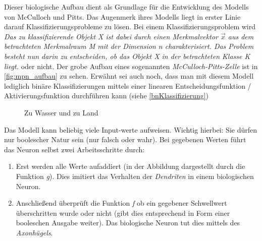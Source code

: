 Dieser biologische Aufbau dient als Grundlage für die Entwicklung des Modells von McCulloch und Pitts. Das Augenmerk ihres Modells liegt in erster Linie darauf Klassifizierungsprobleme zu lösen. Bei einem Klassifizierungsproblem wird \emph{Das zu klassifizierende Objekt X ist dabei durch einen Merkmalvektor $\vec{x}$ aus dem betrachteten Merkmalraum M mit der Dimension n charakterisiert. Das Problem besteht nun darin zu entscheiden, ob das Objekt X in der betrachteten Klasse K liegt.} \cite{klproblem} oder nicht. Der grobe Aufbau eines sogenannten \emph{McCulloch-Pitts-Zelle} ist in \ref{fig:mpn_aufbau} zu sehen. Erwähnt sei auch noch, dass man mit diesem Modell lediglich binäre Klassifizierungen mittels einer linearen Entscheidungsfunktion / Aktivierungsfunktion durchführen kann (siehe \ref{bnKlassifizierung})


\begin{figure}%
  \centering
  \qquad
  \caption{Zu Wasser und zu Land}%
\end{figure}

Das Modell kann beliebig viele Input-werte aufweisen. Wichtig hierbei: Sie dürfen nur boolescher Natur sein (nur falsch oder wahr). Bei gegebenen Werten führt das Neuron selbst zwei Arbeitsschritte durch: 
\begin{enumerate}

\item Erst werden alle Werte aufaddiert (in der Abbildung dargestellt durch die Funktion \emph{g}). Dies imitiert das Verhalten der \emph{Dendriten} in einem biologischen Neuron. 

\item Anschließend überprüft die Funktion \emph{f} ob ein gegebener Schwellwert überschritten wurde oder nicht (gibt dies entsprechend in Form einer booleschen Ausgabe weiter). Das biologische Neuron tut dies mittels des \emph{Axonhügels}. 

\end{enumerate}

